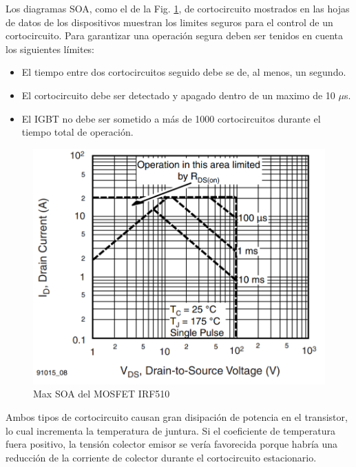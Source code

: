 \documentclass[conference]{IEEEtran}
\begin{document}
Los diagramas SOA, como el de la Fig. \ref{fig:SOA}, de cortocircuito mostrados en las hojas de datos de los dispositivos muestran los limites seguros para el control de un cortocircuito.
Para garantizar una operación segura deben ser tenidos en cuenta los siguientes límites:
\begin{itemize}
	\item El tiempo entre dos cortocircuitos seguido debe se de, al menos, un segundo.
	\item El cortocircuito debe ser detectado y apagado dentro de un maximo de 10 $\mu$s.
	\item El IGBT no debe ser sometido a más de 1000 cortocircuitos durante el tiempo total de operación. 
\end{itemize}

\begin{figure}[H]
	\centering
	\includegraphics[width=\columnwidth]{imagenes/SOA}
	\caption{Max SOA del MOSFET IRF510}
	\label{fig:SOA}
\end{figure}

Ambos tipos de cortocircuito causan gran disipación de potencia en el transistor, lo cual incrementa la temperatura de juntura. Si el coeficiente de temperatura fuera positivo, la tensión colector emisor se vería favorecida porque habría una reducción de la corriente de colector durante el cortocircuito estacionario.
\vfill 
\end{document}
